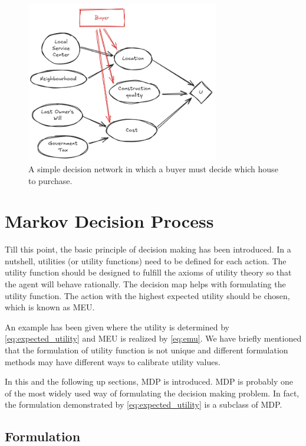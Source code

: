\begin{figure}[!htb]
	\centering
	\includegraphics[width=0.75\textwidth]{./chapters/part-1/figures/decision_network_exp.png}
	\caption{A simple decision network in which a buyer must decide which house to purchase.}
	\label{fig:decisionnetworkexp}
\end{figure}

\section{Markov Decision Process} \label{sec:mdp}

Till this point, the basic principle of decision making has been introduced. In a nutshell, utilities (or utility functions) need to be defined for each action. The utility function should be designed to fulfill the axioms of utility theory so that the agent will behave rationally. The decision map helps with formulating the utility function. The action with the highest expected utility should be chosen, which is known as MEU. 

An example has been given where the utility is determined by \eqref{eq:expected_utility} and MEU is realized by \eqref{eq:emu}. We have briefly mentioned that the formulation of utility function is not unique and different formulation methods may have different ways to calibrate utility values. 

In this and the following up sections, MDP is introduced. MDP is probably one of the most widely used way of formulating the decision making problem. In fact, the formulation demonstrated by \eqref{eq:expected_utility} is a subclass of MDP.

\subsection{Formulation}


